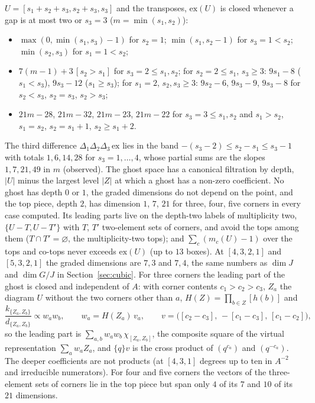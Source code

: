 \documentclass[11pt]{article}
\begin{document}
\begin{itemize}
$U=[s_1+s_2+s_3,s_2+s_3,s_3]$ and the transposes, $\mathrm{ex}(U)$ is closed whenever a gap is at most two or $s_3=3$
($m=\min(s_1,s_2)$):
\begin{itemize}
\item $\max(0,\min(s_1,s_3)-1)$ for $s_2=1$; $\min(s_1,s_2-1)$ for $s_3=1<s_2$; $\min(s_2,s_3)$ for $s_1=1<s_2$;
\item $7(m-1)+3\,[s_2>s_1]$ for $s_3=2\le s_1,s_2$; for $s_2=2\le s_1$, $s_3\ge3$: $9s_1-8$ ($s_1<s_3$), $9s_3-12$
($s_1\ge s_3$); for $s_1=2$, $s_2,s_3\ge3$: $9s_2-6$, $9s_3-9$, $9s_3-8$ for $s_2<s_3$, $s_2=s_3$, $s_2>s_3$;
\item $21m-28$, $21m-32$, $21m-23$, $21m-22$ for $s_3=3\le s_1,s_2$ and $s_1>s_2$, $s_1=s_2$, $s_2=s_1+1$, $s_2\ge s_1+2$.
\end{itemize}
The third difference $\Delta_1\Delta_2\Delta_3\,\mathrm{ex}$ lies in the band $-(s_3-2)\le s_2-s_1\le s_3-1$ with totals
$1,6,14,28$ for $s_3=1,\dots,4$, whose partial sums are the slopes $1,7,21,49$ in $m$ (observed).  The ghost space has a
canonical filtration by depth, $|U|$ minus the largest level $|Z|$ at which a ghost has a non-zero coefficient.  No
ghost has depth $0$ or $1$, the graded dimensions do not depend on the point, and the top piece, depth $2$, has
dimension $1$, $7$, $21$ for three, four, five corners in every case computed.  Its leading parts live on the depth-two
labels of multiplicity two, $\{U-T,U-T'\}$ with $T$, $T'$ two-element sets of corners, and avoid the tops among them
($T\cap T'=\varnothing$, the multiplicity-two tops); and $\sum_c(m_c(U)-1)$ over the tops and co-tops never exceeds
$\mathrm{ex}(U)$ (up to $13$ boxes).  At $[4,3,2,1]$ and $[5,3,2,1]$ the graded dimensions are $7,3$ and $7,4$, the same
numbers as $\dim J$ and $\dim G/J$ in Section~\ref{sec:cubic}.  For three corners the leading part of the ghost is closed
and independent of $A$: with corner contents $c_1>c_2>c_3$, $Z_a$ the diagram $U$ without the two corners other than
$a$, $H(Z)=\prod_{b\in Z}[h(b)]$ and
\[
\frac{k_{\{Z_a,Z_b\}}}{d_{\{Z_a,Z_b\}}}\propto w_aw_b,\qquad w_a=H(Z_a)\,v_a,\qquad
v=\bigl([c_2-c_3],\,-[c_1-c_3],\,[c_1-c_2]\bigr),
\]
so the leading part is $\sum_{a,b}w_aw_b\,\chi_{[Z_a,Z_b]}$, the composite square of the virtual representation
$\sum_aw_aZ_a$, and $\{q\}v$ is the cross product of $(q^{c_a})$ and $(q^{-c_a})$.  The deeper coefficients are not
products (at $[4,3,1]$ degrees up to ten in $A^{-2}$ and irreducible numerators).  For four and five corners the vectors
of the three-element sets of corners lie in the top piece but span only $4$ of its $7$ and $10$ of its $21$ dimensions.

\end{itemize}
\end{document}
